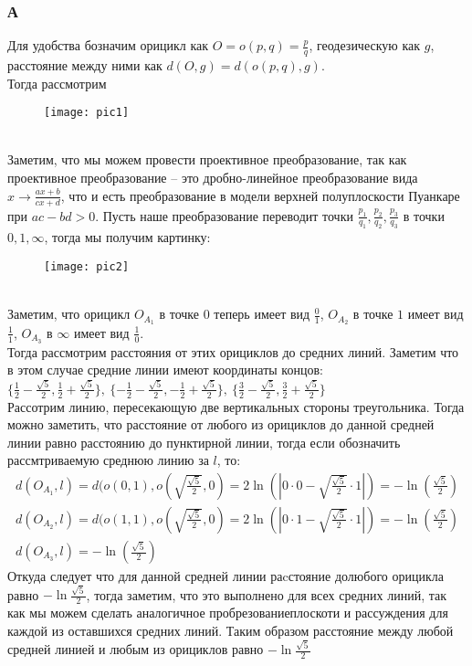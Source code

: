 		\subsubsection*{\textbf{А}}
		Для удобства бозначим орицикл как $O = o(p,q) = \frac{p}{q}$, геодезическую как $g$, расстояние между ними как $d(O, g) = d(o(p,q), g)$.\\
		Тогда рассмотрим\\
		\begin{figure}[h]
			\texttt{[image: pic1]}\\
		\end{figure}\\
		\noindent
		Заметим, что мы можем провести проективное преобразование, так как проективное преобразование -- это дробно-линейное преобразование вида $x \to \frac{ax+b}{cx+d}$, что и есть преобразование в модели верхней полуплоскости Пуанкаре при $ac-bd>0$. Пусть наше преобразование переводит точки $\frac{p_1}{q_1}, \frac{p_2}{q_2}, \frac{p_3}{q_3}$ в точки $0, 1, \infty$, тогда мы получим картинку:\\
		\begin{figure}[h]
			\texttt{[image: pic2]}
		\end{figure}\\
		\noindent
		Заметим, что орицикл $O_{A_1}$ в точке $0$ теперь имеет вид $\frac{0}{1}$, $O_{A_2}$ в точке $1$ имеет вид $\frac{1}{1}$, $O_{A_3}$ в $\infty$ имеет вид $\frac{1}{0}$.\\ Тогда рассмотрим расстояния от этих орициклов до средних линий. Заметим что в этом случае средние линии имеют координаты концов: $\{\frac{1}{2}-\frac{\sqrt{5}}{2}, \frac{1}{2}+\frac{\sqrt{5}}{2}\},\ \{-\frac{1}{2}-\frac{\sqrt{5}}{2}, -\frac{1}{2}+\frac{\sqrt{5}}{2}\},\ \{\frac{3}{2}-\frac{\sqrt{5}}{2}, \frac{3}{2}+\frac{\sqrt{5}}{2}\}$\\
		Рассотрим линию, пересекающую две вертикальных стороны треугольника. Тогда можно заметить, что расстояние от любого из орициклов до данной средней линии равно расстоянию до пунктирной линии, тогда если обозначить рассмтриваемую среднюю линию за $l$, то:
		\begin{gather*}
		d(O_{A_1}, l) = d(o(0, 1), o(\sqrt{\frac{\sqrt{5}}{2}}, 0) = 2\ln(|0 \cdot 0 - \sqrt{\frac{\sqrt{5}}{2}} \cdot 1|) = -\ln(\frac{\sqrt{5}}{2})\\	
		d(O_{A_2}, l) = d(o(1, 1), o(\sqrt{\frac{\sqrt{5}}{2}}, 0) = 2\ln(|0 \cdot 1 - \sqrt{\frac{\sqrt{5}}{2}} \cdot 1|) = -\ln(\frac{\sqrt{5}}{2})\\	
		d(O_{A_3}, l) = -\ln(\frac{\sqrt{5}}{2})	
		\end{gather*}
		\noindent
		Откуда следует что для данной средней линии раcстояние долюбого орицикла равно $-\ln\frac{\sqrt{5}}{2}$, тогда заметим, что это выполнено для всех средних линий, так как мы можем сделать аналогичное пробрезованиеплоскоти и рассуждения для каждой из оставшихся средних линий.
		Таким образом расстояние между любой средней линией и любым из орициклов равно $-\ln\frac{\sqrt{5}}{2}$ 
		
